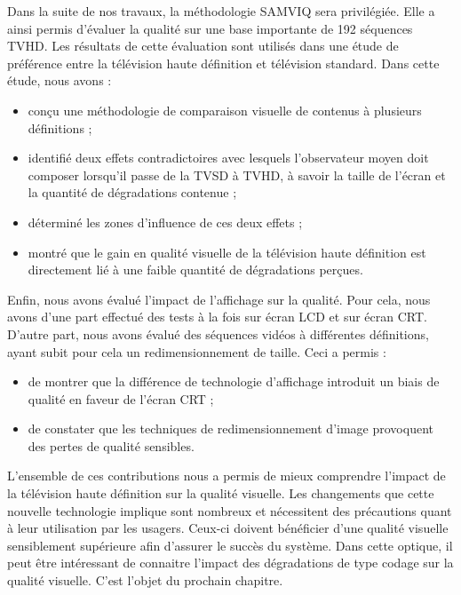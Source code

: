 Dans la suite de nos travaux, la méthodologie SAMVIQ sera privilégiée. Elle a ainsi permis d'évaluer la qualité sur une base importante de 192 séquences TVHD. Les résultats de cette évaluation sont utilisés dans une étude de préférence entre la télévision haute définition et télévision standard. Dans cette étude, nous avons :
\begin{itemize}
\item conçu une méthodologie de comparaison visuelle de contenus à plusieurs définitions ;
\item identifié deux effets contradictoires avec lesquels l'observateur moyen doit composer lorsqu'il passe de la TVSD à TVHD, à savoir la taille de l'écran et la quantité de dégradations contenue ;
\item déterminé les zones d'influence de ces deux effets ;
\item montré que le gain en qualité visuelle de la télévision haute définition est directement lié à une faible quantité de dégradations perçues.
\end{itemize}

Enfin, nous avons évalué l'impact de l'affichage sur la qualité. Pour cela, nous avons d'une part effectué des tests à la fois sur écran LCD et sur écran CRT. D'autre part, nous avons évalué des séquences vidéos à différentes définitions, ayant subit pour cela un redimensionnement de taille. Ceci a permis :
\begin{itemize}
\item de montrer que la différence de technologie d'affichage introduit un biais de qualité en faveur de l'écran CRT ;
\item de constater que les techniques de redimensionnement d'image provoquent des pertes de qualité sensibles.
\end{itemize}

L'ensemble de ces contributions nous a permis de mieux comprendre l'impact de la télévision haute définition sur la qualité visuelle. Les changements que cette nouvelle technologie implique sont nombreux et nécessitent des précautions quant à leur utilisation par les usagers. Ceux-ci doivent bénéficier d'une qualité visuelle sensiblement supérieure afin d'assurer le succès du système. Dans cette optique, il peut être intéressant de connaitre l'impact des dégradations de type codage sur la qualité visuelle. C'est l'objet du prochain chapitre.


\ornementChapitre
